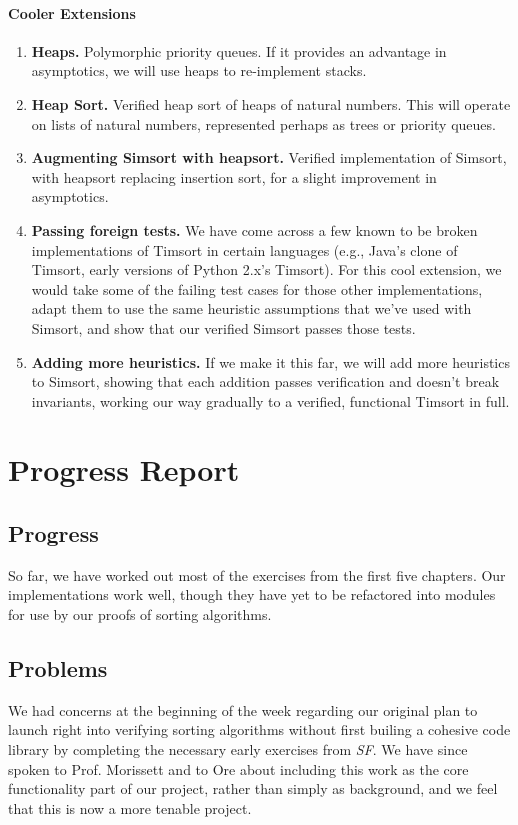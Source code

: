 \documentclass{article}
\begin{document}
\paragraph{Cooler Extensions}
\begin{enumerate}
  \item \textbf{Heaps.}
    Polymorphic priority queues.
    If it provides an advantage in asymptotics,
    we will use heaps to re-implement stacks.
  \item \textbf{Heap Sort.}
    Verified heap sort of heaps of natural numbers.
    This will operate on lists of natural numbers, represented perhaps
    as trees or priority queues.
  \item \textbf{Augmenting Simsort with heapsort.}
    Verified implementation of Simsort, with heapsort replacing
    insertion sort, for a slight improvement in asymptotics.
  \item \textbf{Passing foreign tests.}
    We have come across a few known to be broken implementations of Timsort
    in certain languages (e.g., Java's clone of Timsort,
    early versions of Python 2.x's Timsort).
    For this cool extension, we would take some of the failing test cases for
    those other implementations, adapt them to use the same heuristic
    assumptions that we've used with Simsort, and show that our verified
    Simsort passes those tests.
  \item \textbf{Adding more heuristics.}
    If we make it this far, we will add more heuristics to Simsort,
    showing that each addition passes verification and doesn't break
    invariants, working our way gradually to a verified, functional
    Timsort in full.
\end{enumerate}


\section{Progress Report}
\subsection{Progress}
  So far, we have worked out most of the exercises from the first five chapters.
  Our implementations work well, though they have yet to be refactored into
  modules for use by our proofs of sorting algorithms.
\subsection{Problems}
  We had concerns at the beginning of the week regarding our original plan to
  launch right into verifying sorting algorithms without first builing a cohesive
  code library by completing the necessary early exercises from \emph{SF}.
  We have since spoken to Prof. Morissett and to Ore about including this work
  as the core functionality part of our project, rather than simply as
  background, and we feel that this is now a more tenable project.
\end{document}
